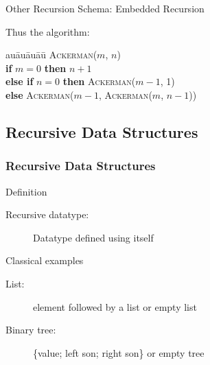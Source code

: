 \begin{Coupe}
\begin{frame}{Other Recursion Schema: \alert{Embedded Recursion}}
\begin{block}{Thus the algorithm:}\vspace{-.8\baselineskip}
\begin{tabbing}
  au\=au\=au\=au\=\kill
  \textsc{Ackerman}($m$, $n$)\\
  \> \textbf{if} $m = 0$ \= \textbf{then} $n+1$\\
  \> \> \textbf{else if} $n = 0$ \=\textbf{then} \textsc{Ackerman}($m-1$, 1)\\
  \> \>                           \>\textbf{else} \textsc{Ackerman}\alert{(}$m-1$, \textsc{Ackerman}($m$, $n-1$)\alert{)}
\end{tabbing}
\end{block}\vspace{-.8\baselineskip}

\end{frame}
\subsection{Recursive Data Structures}
\begin{frame}\frametitle{Recursive Data Structures}

  \begin{alertblock}{Definition}
    \begin{description}
    \item[Recursive datatype:] Datatype defined using itself
    \end{description}
  \end{alertblock}

  \begin{block}{Classical examples}
    \begin{description}
    \item[List:] element followed by a list or empty list
    \item[Binary tree:] \{value; left son; right son\} or empty tree
    \end{description}
  \end{block}



\end{frame}
\end{Coupe}

